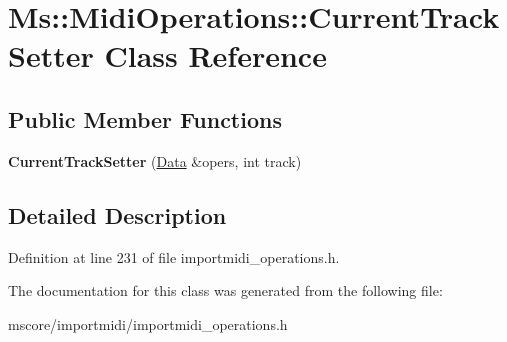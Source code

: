 \hypertarget{class_ms_1_1_midi_operations_1_1_current_track_setter}{}\section{Ms\+:\+:Midi\+Operations\+:\+:Current\+Track\+Setter Class Reference}
\label{class_ms_1_1_midi_operations_1_1_current_track_setter}
\subsection*{Public Member Functions}
\begin{DoxyCompactItemize}
\item 
\mbox{\label{class_ms_1_1_midi_operations_1_1_current_track_setter_a236789548760a41f99b6696a3d28c78c}} 
{\bfseries Current\+Track\+Setter} (\hyperlink{class_ms_1_1_midi_operations_1_1_data}{Data} \&opers, int track)
\end{DoxyCompactItemize}


\subsection{Detailed Description}


Definition at line 231 of file importmidi\+\_\+operations.\+h.



The documentation for this class was generated from the following file\+:\begin{DoxyCompactItemize}
\item 
mscore/importmidi/importmidi\+\_\+operations.\+h\end{DoxyCompactItemize}

